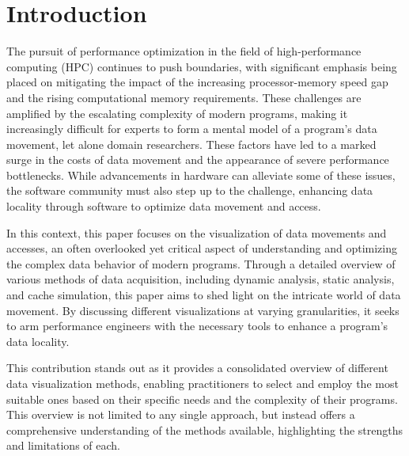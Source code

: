 \section{Introduction}\label{sec:introduction}
The pursuit of performance optimization in the field of high-performance computing (HPC) continues to push boundaries, with significant emphasis being placed on mitigating the impact of the increasing processor-memory speed gap and the rising computational memory requirements. These challenges are amplified by the escalating complexity of modern programs, making it increasingly difficult for experts to form a mental model of a program's data movement, let alone domain researchers. These factors have led to a marked surge in the costs of data movement and the appearance of severe performance bottlenecks. While advancements in hardware can alleviate some of these issues, the software community must also step up to the challenge, enhancing data locality through software to optimize data movement and access.

In this context, this paper focuses on the visualization of data movements and accesses, an often overlooked yet critical aspect of understanding and optimizing the complex data behavior of modern programs. Through a detailed overview of various methods of data acquisition, including dynamic analysis, static analysis, and cache simulation, this paper aims to shed light on the intricate world of data movement. By discussing different visualizations at varying granularities, it seeks to arm performance engineers with the necessary tools to enhance a program's data locality.

This contribution stands out as it provides a consolidated overview of different data visualization methods, enabling practitioners to select and employ the most suitable ones based on their specific needs and the complexity of their programs. This overview is not limited to any single approach, but instead offers a comprehensive understanding of the methods available, highlighting the strengths and limitations of each.

